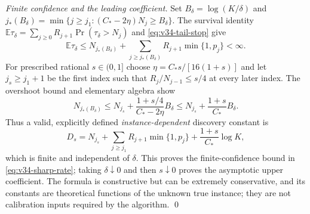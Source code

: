\documentclass{article}
\theoremstyle{plain}
\theoremstyle{definition}
\begin{document}
\emph{Finite confidence and the leading coefficient.}
Set $B_\delta=\log(K/\delta)$ and
$j_*(B_\delta)=\min\{j\ge j_1:(C_*-2\eta)N_j\ge B_\delta\}$.
The survival identity $\mathbb E\tau_\delta=
\sum_{j\ge0}R_{j+1}\Pr(\tau_\delta>N_j)$ and
\eqref{eq:v34-tail-stop} give
\begin{equation}
 \mathbb E\tau_\delta\le N_{j_*(B_\delta)}+
 \sum_{j\ge j_*(B_\delta)}R_{j+1}\min\{1,p_j\}<\infty.
 \label{eq:v34-finite-envelope}
\end{equation}
For prescribed rational $s\in(0,1]$ choose
$\eta=C_*s/[16(1+s)]$ and let $j_s\ge j_1+1$ be the first index
such that $R_j/N_{j-1}\le s/4$ at every later index. The overshoot
bound and elementary algebra show
\[
 N_{j_*(B_\delta)}\le N_{j_s}+
 \frac{1+s/4}{C_*-2\eta}B_\delta
 \le N_{j_s}+\frac{1+s}{C_*}B_\delta.
\]
Thus a valid, explicitly defined \emph{instance-dependent} discovery
constant is
\begin{equation}
 D_s=N_{j_s}+\sum_{j\ge j_1}R_{j+1}\min\{1,p_j\}
 +\frac{1+s}{C_*}\log K,
 \label{eq:v34-discovery-constant}
\end{equation}
which is finite and independent of $\delta$.
This proves the finite-confidence bound in
\eqref{eq:v34-sharp-rate}; taking $\delta\downarrow0$ and then
$s\downarrow0$ proves the asymptotic upper coefficient.
The formula is constructive but can be extremely conservative, and
its constants are theoretical functions of the unknown true instance;
they are not calibration inputs required by the algorithm.
\qed
\end{document}
